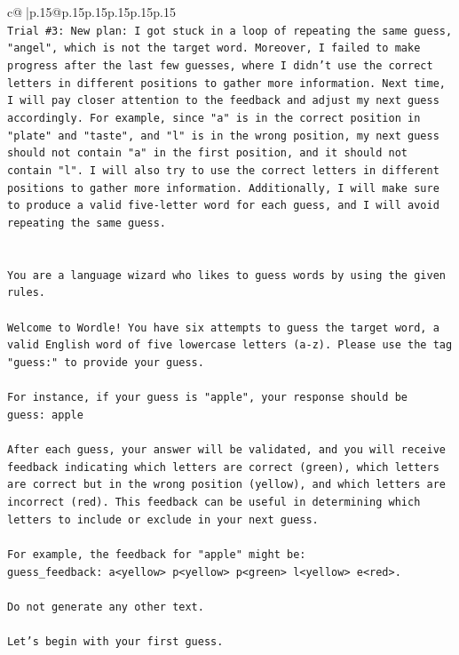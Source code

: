 \documentclass{article}
\begin{document}
{\begin{supertabular}{c@{$\;$}|p{.15\linewidth}@{}p{.15\linewidth}p{.15\linewidth}p{.15\linewidth}p{.15\linewidth}p{.15\linewidth}}
{{{\\ 
\texttt{Trial \#3: New plan: I got stuck in a loop of repeating the same guess, "angel", which is not the target word. Moreover, I failed to make progress after the last few guesses, where I didn't use the correct letters in different positions to gather more information. Next time, I will pay closer attention to the feedback and adjust my next guess accordingly. For example, since "a" is in the correct position in "plate" and "taste", and "l" is in the wrong position, my next guess should not contain "a" in the first position, and it should not contain "l". I will also try to use the correct letters in different positions to gather more information. Additionally, I will make sure to produce a valid five{-}letter word for each guess, and I will avoid repeating the same guess.} \\
\\ 
\\ 
\texttt{You are a language wizard who likes to guess words by using the given rules.} \\
\\ 
\texttt{Welcome to Wordle! You have six attempts to guess the target word, a valid English word of five lowercase letters (a{-}z). Please use the tag "guess:" to provide your guess.} \\
\\ 
\texttt{For instance, if your guess is "apple", your response should be} \\
\texttt{guess: apple} \\
\\ 
\texttt{After each guess, your answer will be validated, and you will receive feedback indicating which letters are correct (green), which letters are correct but in the wrong position (yellow), and which letters are incorrect (red). This feedback can be useful in determining which letters to include or exclude in your next guess.} \\
\\ 
\texttt{For example, the feedback for "apple" might be:} \\
\texttt{guess\_feedback: a<yellow> p<yellow> p<green> l<yellow> e<red>.} \\
\\ 
\texttt{Do not generate any other text.} \\
\\ 
\texttt{Let's begin with your first guess.} \\
            }
        }
    }
     \\ \\


\end{supertabular}}
\end{document}
